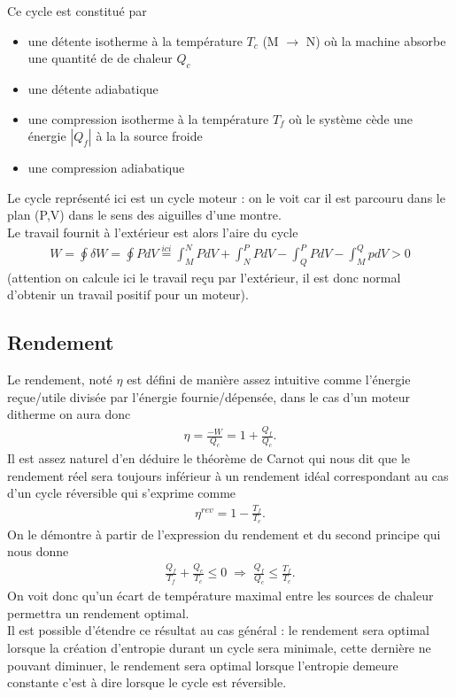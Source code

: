\documentclass[12pt,prb,aps,epsf]{report}
\begin{document}
Ce cycle est constitué par 
\begin{itemize}
	\item une détente isotherme à la température $T_c$ (M $\rightarrow$ N) où la machine absorbe une quantité de de chaleur $Q_c$
	\item une détente adiabatique
	\item une compression isotherme à la température $T_f$ où le système cède une énergie $|Q_f|$ à la la source froide
	\item une compression adiabatique
\end{itemize}
Le cycle représenté ici est un cycle moteur : on le voit car il est parcouru dans le plan (P,V) dans le sens des aiguilles d'une montre.\\
Le travail fournit à l'extérieur est alors l'aire du cycle 
\begin{eqnarray}
W = \oint \delta W = \oint PdV \stackrel{ici}{=} \int_M^N PdV + \int _N^P PdV - \int_Q^P PdV - \int _M^Q pdV > 0
\end{eqnarray}
(attention on calcule ici le travail reçu par l'extérieur, il est donc normal d'obtenir un travail positif pour un moteur).

\subsection{Rendement}
Le rendement, noté $\eta$ est défini de manière assez intuitive comme l'énergie reçue/utile divisée par l'énergie fournie/dépensée, dans le cas d'un moteur ditherme on aura donc 
\begin{eqnarray}
\eta = \frac{-W}{Q_c} = 1 +\frac{Q_f}{Q_c}.
\end{eqnarray}
Il est assez naturel d'en déduire le théorème de Carnot qui nous dit que le rendement réel sera toujours inférieur à un rendement idéal correspondant au cas d'un cycle réversible qui s'exprime comme 
\begin{eqnarray}
\eta^{rev} = 1 - \frac{T_f}{T_c}.
\end{eqnarray}
On le démontre à partir de l'expression du rendement et du second principe qui nous donne 
\begin{eqnarray}
\frac{Q_f}{T_f} + \frac{Q_c}{T_c} \leq 0 \; \Longrightarrow \; \frac{Q_f}{Q_c} \leq \frac{T_f}{T_c}.
\end{eqnarray}
On voit donc qu'un écart de température maximal entre les sources de chaleur permettra un rendement optimal.\\

Il est possible d'étendre ce résultat au cas général : le rendement sera optimal lorsque la création d'entropie durant un cycle sera minimale, cette dernière ne pouvant diminuer, le rendement sera optimal lorsque l'entropie demeure constante c'est à dire lorsque le cycle est réversible.\\
\end{document}
